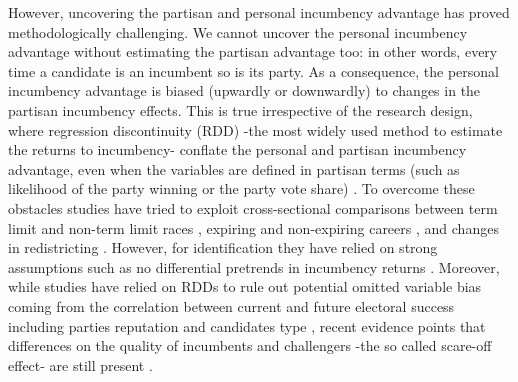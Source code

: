 \documentclass[12pt]{amsart}
\numberwithin{equation}{section}
\theoremstyle{definition}
\theoremstyle{definition}
\theoremstyle{definition}
\begin{document}
However, uncovering the partisan and personal incumbency advantage has proved methodologically challenging. We cannot uncover the personal incumbency advantage without estimating the partisan advantage too: in other words, every time a candidate is an incumbent so is its party. As a consequence, the personal incumbency advantage is biased (upwardly or downwardly) to changes in the partisan incumbency effects. This is true irrespective of the research design, where regression discontinuity (RDD) -the most widely used method to estimate the returns to incumbency- conflate the personal and partisan incumbency advantage, even when the variables are defined in partisan terms (such as likelihood of the party winning or the party vote share) \citep{fowler_hall_2014}. To overcome these obstacles studies have tried to exploit cross-sectional comparisons between term limit and non-term limit races \citep{gelman_king_1990}, expiring and non-expiring careers \citep{fowler_hall_2014}, and changes in redistricting \citep{ansolabehere_etal_2000, desposato_petrocik_2003, sekhon_titiunik_2012}. However, for identification they have relied on strong assumptions such as no differential pretrends in incumbency returns \citep{fowler_hall_2014, ansolabehere_snyder_2004}. %
Moreover,  while studies have relied on RDDs to rule out potential omitted variable bias coming from the correlation between current and future electoral success including parties reputation and candidates type \citep{klasnja_titiunik_2017}, recent evidence points that differences on the quality of incumbents and challengers -the so called scare-off effect- are still present \citep{eggers_2017}. 
\end{document}
